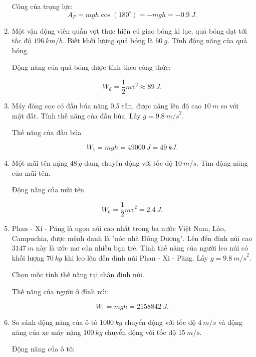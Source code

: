 \begin{enumerate}[label=\bfseries Câu \arabic*:, leftmargin=1.5cm]
	\hideall
	{	
		Công của trọng lực:
		$$A_P = mgh\cos(180^\circ) = -mgh = \SI{-0.9}{J}.$$
	}
	
	\item {}
	
	
	{
		Một vận động viên quần vợt thực hiện cú giao bóng kỉ lục, quả bóng đạt tới tốc độ $\SI{196}{km/h}$. Biết khối lượng quả bóng là $\SI{60}{g}.$ Tính động năng của quả bóng.
	}
	
	\hideall
	{	
		Động năng của quả bóng được tính theo công thức:
		
		$$W_\text{đ} =\dfrac{1}{2}mv^2 \approx \SI{89}{J}.$$
	}
	
	\item {}
	
	
	{
		Máy đóng cọc có đầu búa nặng 0,5 tấn, được nâng lên độ cao $\SI{10}{m}$ so với mặt đất. Tính thế năng của đầu búa. Lấy $g = \SI{9,8}{m/s}^2$.
	}
	
	\hideall
	{	
		Thế năng của đầu búa
		
		$$W_\text{t} = mgh = \SI{49000}{J} = \SI{49}{kJ}.$$
	}
	
	
	
	\item {}
	
	
	{
		Một mũi tên nặng $\SI{48}{g}$ đang chuyển động với tốc độ $\SI{10}{m/s}$. Tìm động năng của mũi tên.
	}
	
	\hideall
	{	
		Động năng của mũi tên
		
		$$W_\text{đ} = \dfrac{1}{2}mv^2 =\SI{2,4}{J}.$$
	}
	\item {}
	
	
	{
		Phan - Xi - Păng là ngọn núi cao nhất trong ba nước Việt Nam, Lào, Campuchia, được mệnh danh là "nóc nhà Đông Dương". Lên đến đỉnh núi cao $\SI{3147}{m}$ này là ước mơ của nhiều bạn trẻ. Tính thế năng của người leo núi có khối lượng $\SI{70}{kg}$ khi leo lên đến đỉnh núi Phan - Xi - Păng. Lấy $g = \SI{9,8}{m/s}^2.$
	}
	
	\hideall
	{	
		Chọn mốc tính thế năng tại chân đỉnh núi.
		
		Thế năng của người ở đỉnh núi:
		
		$$W_\text{t} = mgh = \SI{2158842}{J}.$$
	}
	\item {}
	
	
	{
		So sánh động năng của ô tô $\SI{1000}{kg}$ chuyển động với tốc độ $\SI{4}{m/s}$ và động năng của xe máy nặng $\SI{100}{kg} $ chuyển động với tốc độ $\SI{15}{m/s}$.
	}
	
	\hideall
	{	
		Động năng của ô tô:
		
}
\end{enumerate}

